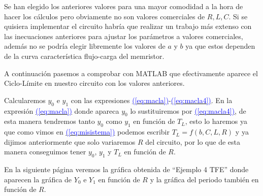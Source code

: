 \documentclass[12pt,a4paper]{report} %
\newcommand{\eref}[1]{\hyperref[#1]{\textcolor{blue}{(\ref*{#1})}}}
\newcommand{\eref}[1]{\hyperref[#1]{\textcolor{blue}{\textit{(\ref*{#1})}}}}
\begin{document}
	\vspace{0.5cm}\noindent Se han elegido los anteriores valores para una mayor comodidad a la hora de hacer los cálculos pero obviamente no son valores comerciales de $R,L,C$. Si se quisiera implementar el circuito habría que realizar un trabajo más extenso con las inecuaciones anteriores para ajustar los parámetros a valores comerciales, además no se podría elegir libremente los valores de $a$ y $b$ ya que estos dependen de la curva característica flujo-carga del memristor.
	
	\vspace{0.5cm} A continuación pasemos a comprobar con MATLAB que efectivamente aparece el Ciclo-Límite en nuestro circuito con los valores anteriores.
	
	 \vspace{0.5cm}Calcularemos $y_0$ e $y_1$ con las expresiones \eref{eq:macla}-\eref{eq:macla4}. En la expresión \eref{eq:macla} donde apareca $y_0$ lo sustituiremos por \eref{eq:macla4}, de esta manera tendremos tanto $y_0$ como $y_1$ en función de $T_L$, esto lo haremos ya que como vimos en \eref{eq:misistema} podemos escribir $T_L=f(b,C,L,R)$ y ya dijimos anteriormente que solo variaremos $R$ del circuito, por lo que de esta manera conseguimos tener $y_0$, $y_1$ y $T_L$ en función de $R$.
	
	\newpage
	
	
	
	\newpage
	
	
	
	\vspace{1cm}\noindent En la siguiente página veremos la gráfica obtenida de ``Ejemplo 4 TFE'' donde aparecen la gráfica de $Y_0$ e $Y_1$ en función de $R$ y la gráfica del periodo también en función de $R$.

\newpage
\end{document}
